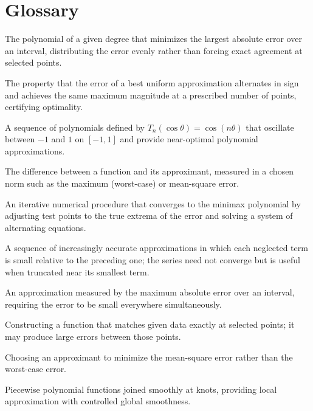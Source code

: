 \section*{Glossary}
\begin{description}[leftmargin=*,style=nextline,itemsep=0.3em]

\item[\textbf{Minimax polynomial.}] The polynomial of a given degree that minimizes the largest absolute error over an interval, distributing the error evenly rather than forcing exact agreement at selected points.

\item[\textbf{Equioscillation.}] The property that the error of a best uniform approximation alternates in sign and achieves the same maximum magnitude at a prescribed number of points, certifying optimality.

\item[\textbf{Chebyshev polynomial.}] A sequence of polynomials defined by $T_n(\cos\theta)=\cos(n\theta)$ that oscillate between $-1$ and $1$ on $[-1,1]$ and provide near-optimal polynomial approximations.

\item[\textbf{Approximation error.}] The difference between a function and its approximant, measured in a chosen norm such as the maximum (worst-case) or mean-square error.

\item[\textbf{Remez algorithm.}] An iterative numerical procedure that converges to the minimax polynomial by adjusting test points to the true extrema of the error and solving a system of alternating equations.

\item[\textbf{Asymptotic expansion.}] A sequence of increasingly accurate approximations in which each neglected term is small relative to the preceding one; the series need not converge but is useful when truncated near its smallest term.

\item[\textbf{Uniform approximation.}] An approximation measured by the maximum absolute error over an interval, requiring the error to be small everywhere simultaneously.

\item[\textbf{Interpolation.}] Constructing a function that matches given data exactly at selected points; it may produce large errors between those points.

\item[\textbf{Least-squares approximation.}] Choosing an approximant to minimize the mean-square error rather than the worst-case error.

\item[\textbf{Splines.}] Piecewise polynomial functions joined smoothly at knots, providing local approximation with controlled global smoothness.

\end{description}


